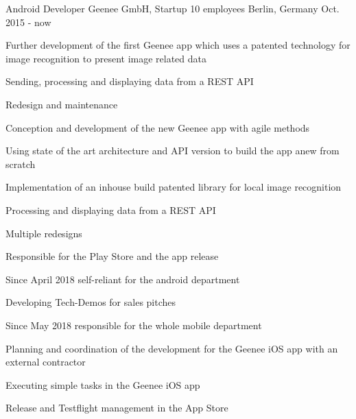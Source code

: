 

\begin{cventries}

  \cventry
    {Android Developer} %
    {Geenee GmbH, Startup 10 employees} %
    {Berlin, Germany} %
    {Oct. 2015 - now} %
    {
      \begin{cvitems} %
        \item {Further development of the first Geenee app which uses a patented technology for image recognition to present image related data}
        \begin{cvsubitems}
          \item {Sending, processing and displaying data from a REST API}
          \item {Redesign and maintenance}
        \end{cvsubitems}
        \item {Conception and development of the new Geenee app with agile methods}
        \begin{cvsubitems}
          \item {Using state of the art architecture and API version to build the app anew from scratch}
          \item {Implementation of an inhouse build patented library for local image recognition}
          \item {Processing and displaying data from a REST API}
          \item {Multiple redesigns}
          \item {Responsible for the Play Store and the app release}
          \item {Since April 2018 self-reliant for the android department}
        \end{cvsubitems}
        \item {Developing Tech-Demos for sales pitches}
        \item {Since May 2018 responsible for the whole mobile department}
        \begin{cvsubitems}
        \item {Planning and coordination of the development for the Geenee iOS app with an external contractor}
        \item {Executing simple tasks in the Geenee iOS app}
        \item {Release and Testflight management in the App Store}
        \end{cvsubitems}
      \end{cvitems}
    }


\end{cventries}

